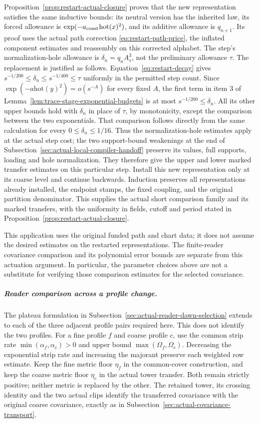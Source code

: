 Proposition~\ref{prop:restart-actual-closure} proves that the new
representation satisfies the same inductive bounds: its neutral version
has the inherited law, its forced allowance is
$\exp(-a_{\rm coast}\mathrm{hot}(x)^2)$, and its additive allowance is
$q_{n+1}$. Its proof uses the actual path correction
\eqref{eq:restart-path-price}, the inflated component estimates and
reassembly on this corrected alphabet. The step's normalization-hole allowance is $\delta_n=q_nA_s^3$,
not the preliminary allowance $\tau$. The replacement is justified as
follows. Equation~\eqref{eq:restart-decay} gives
$s^{-1/200}\le\delta_n\le s^{-1/400}\le\tau$ uniformly in the
permitted step count. Since
$\exp(-a\mathrm{hot}(y)^2)=o(s^{-A})$ for every fixed $A$,
the first term in item 3 of
Lemma~\ref{lem:trace-stage-exponential-budgets} is at most
$s^{-1/200}\le\delta_n$. All its other upper bounds hold with
$\delta_n$ in place of $\tau$, by monotonicity, except the comparison
between the two exponentials. That comparison follows directly from
the same calculation for every $0\le\delta_n\le1/16$.
Thus the normalization-hole estimates apply at the actual step cost;
 the two support-bound weakenings at the end of
Subsection~\ref{sec:actual-local-compiler-handoff} preserve its values,
full supports, loading and hole normalization. They therefore give the
upper and lower marked transfer estimates on this particular step.
Install this new representation only at its coarse level and continue
backwards. Induction preserves all representations already installed,
the endpoint stamps, the fixed coupling, and the original partition
denominator. This supplies the actual short comparison family and its
marked transfers, with the uniformity in fields, cutoff and period
stated in Proposition~\ref{prop:restart-actual-closure}.

This application uses the original funded path and chart data; it does
not assume the desired estimates on the restarted representations. The
finite-reader covariance comparison and its polynomial error bounds
are separate from this actuation argument. In particular, the
parameter choices above are not a substitute for verifying those
comparison estimates for the selected covariance.

\subparagraph{Reader comparison across a profile change.}
The plateau formulation in
Subsection~\ref{sec:actual-reader-dawn-selection} extends to each of the
three adjacent profile pairs required here. This does not identify the
two profiles. For a fine profile $f$ and coarse profile $c$, use the
common strip rate $\min(\alpha_f,\alpha_c)>0$ and upper bound
$\max(\Omega_f,\Omega_c)$. Decreasing the exponential strip rate
and increasing the majorant preserve each weighted row estimate.
Keep the fine metric floor $\eta_f$ in the common-cover construction,
and keep the coarse metric floor $\eta_c$ in the actual tower transfer.
Both remain strictly positive; neither metric is replaced by the other.
The retained tower, its crossing identity and the two actual clips
identify the transferred covariance with the original coarse covariance,
exactly as in Subsection~\ref{sec:actual-covariance-transport}.

